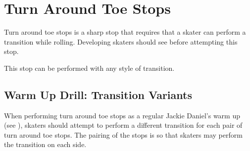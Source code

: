 \section{Turn Around Toe Stops}
\label{sec:stopping/turn_around}

Turn around toe stops is a sharp stop that requires that a skater can perform a transition while rolling. 
Developing skaters should see  before attempting this stop. 


This stop can be performed with any style of transition. 



\subsection*{Warm Up Drill: Transition Variants}

When performing turn around toe stops as a regular Jackie Daniel's warm up (see ), skaters should attempt to perform a different transition for each pair of turn around toe stops.
The pairing of the stops is so that skaters may perform the transition on each side. 
